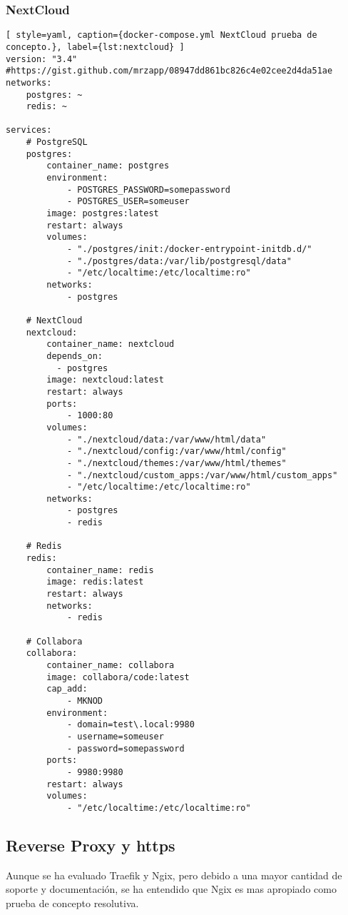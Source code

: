 \subsubsection{NextCloud}
\begin{lstlisting}[ style=yaml, caption={docker-compose.yml NextCloud prueba de concepto.}, label={lst:nextcloud} ]
version: "3.4"
#https://gist.github.com/mrzapp/08947dd861bc826c4e02cee2d4da51ae
networks: 
    postgres: ~
    redis: ~

services:
    # PostgreSQL
    postgres: 
        container_name: postgres
        environment: 
            - POSTGRES_PASSWORD=somepassword
            - POSTGRES_USER=someuser
        image: postgres:latest
        restart: always
        volumes: 
            - "./postgres/init:/docker-entrypoint-initdb.d/"
            - "./postgres/data:/var/lib/postgresql/data"
            - "/etc/localtime:/etc/localtime:ro"
        networks: 
            - postgres

    # NextCloud
    nextcloud: 
        container_name: nextcloud
        depends_on: 
          - postgres
        image: nextcloud:latest
        restart: always
        ports:
            - 1000:80
        volumes: 
            - "./nextcloud/data:/var/www/html/data"
            - "./nextcloud/config:/var/www/html/config"
            - "./nextcloud/themes:/var/www/html/themes"
            - "./nextcloud/custom_apps:/var/www/html/custom_apps"
            - "/etc/localtime:/etc/localtime:ro"
        networks: 
            - postgres
            - redis

    # Redis
    redis:
        container_name: redis
        image: redis:latest
        restart: always
        networks:
            - redis

    # Collabora
    collabora:
        container_name: collabora
        image: collabora/code:latest
        cap_add: 
            - MKNOD
        environment: 
            - domain=test\.local:9980
            - username=someuser
            - password=somepassword
        ports:
            - 9980:9980
        restart: always
        volumes:
            - "/etc/localtime:/etc/localtime:ro"
\end{lstlisting}

\subsection{Reverse Proxy y https}\label{S:reverse_proxy_example}
Aunque se ha evaluado Traefik\cite{c_traefik} y Ngix\cite{c_ngix}, pero debido a una mayor cantidad de soporte y documentación, se ha entendido que Ngix es mas apropiado como prueba de concepto resolutiva.

